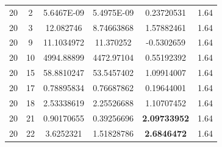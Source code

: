 \documentclass[runningheads]{llncs}
\begin{document}
\begin{table}[H]
{\begin{tabular}{|c|c|c|c|c|c|}
20        & 2        & 5.6467E-09   & 5.4975E-09 & 0.23720531                & 1.64           \\
20        & 3        & 12.082746    & 8.74663868 & 1.57882461                & 1.64           \\
20        & 9        & 11.1034972   & 11.370252  & -0.5302659                & 1.64           \\
20        & 10       & 4994.88899   & 4472.97104 & 0.55192392                & 1.64           \\
20        & 15       & 58.8810247   & 53.5457402 & 1.09914007                & 1.64           \\
20        & 17       & 0.78895834   & 0.76687862 & 0.19644001                & 1.64           \\
20        & 18       & 2.53338619   & 2.25526688 & 1.10707452                & 1.64           \\
20        & 21       & 0.90170655   & 0.39256696 & \textbf{2.09733952}       & 1.64           \\
20        & 22       & 3.6252321    & 1.51828786 & \textbf{2.6846472}        & 1.64         \\
\hline
\end{tabular}}
\end{table}
\end{document}
